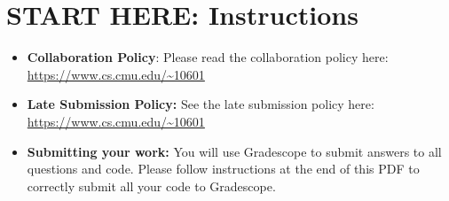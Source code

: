 \documentclass[11pt,addpoints,answers]{exam}
\begin{document}
\section*{START HERE: Instructions}
\begin{itemize}

\item \textbf{Collaboration Policy}: Please read the collaboration policy here: \url{https://www.cs.cmu.edu/~10601}

\item\textbf{Late Submission Policy:} See the late submission policy here: \url{https://www.cs.cmu.edu/~10601}

\item\textbf{Submitting your work:} You will use Gradescope to submit
  answers to all questions and code. Please
  follow instructions at the end of this PDF to correctly submit all your code to Gradescope.

  \begin{itemize}
    

    

\end{itemize}
\end{itemize}
\end{document}
